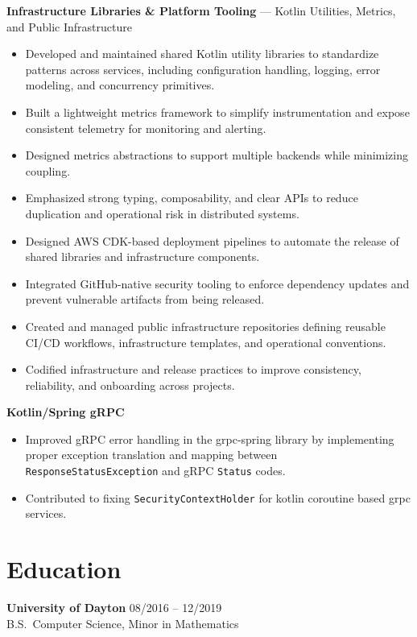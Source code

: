 \documentclass[11pt]{article}
\begin{document}
    \noindent\textbf{Infrastructure Libraries \& Platform Tooling} --- Kotlin Utilities, Metrics, and Public Infrastructure
    \begin{itemize}
        \item Developed and maintained shared Kotlin utility libraries to standardize patterns across services, including configuration handling, logging, error modeling, and concurrency primitives.
        \item Built a lightweight metrics framework to simplify instrumentation and expose consistent telemetry for monitoring and alerting.
        \item Designed metrics abstractions to support multiple backends while minimizing coupling.
        \item Emphasized strong typing, composability, and clear APIs to reduce duplication and operational risk in distributed systems.
        \item Designed AWS CDK-based deployment pipelines to automate the release of shared libraries and infrastructure components.
        \item Integrated GitHub-native security tooling to enforce dependency updates and prevent vulnerable artifacts from being released.
        \item Created and managed public infrastructure repositories defining reusable CI/CD workflows, infrastructure templates, and operational conventions.
        \item Codified infrastructure and release practices to improve consistency, reliability, and onboarding across projects.
    \end{itemize}

    \vspace{4mm}

    \noindent\textbf{Kotlin/Spring gRPC}
    \begin{itemize}
        \item Improved gRPC error handling in the grpc-spring library by implementing proper exception translation and mapping between \texttt{ResponseStatusException} and gRPC \texttt{Status} codes.
        \item Contributed to fixing \texttt{SecurityContextHolder} for kotlin coroutine based grpc services.
    \end{itemize}


    \section*{Education}
    \textbf{University of Dayton} \hfill 08/2016 -- 12/2019 \\
    B.S.\ Computer Science, Minor in Mathematics
\end{document}
